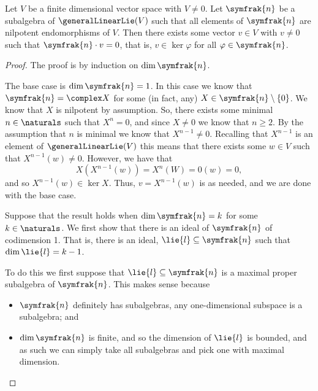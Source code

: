 \documentclass[fleqn]{NotesClass}
\newcommand{\nilpotentLie}{\symfrak{n}}
\begin{document}
    \begin{thm}{}{}
        Let \(V\) be a finite dimensional vector space with \(V \ne 0\).
        Let \(\nilpotentLie\) be a subalgebra of \(\generalLinearLie(V)\) such that all elements of \(\nilpotentLie\) are nilpotent endomorphisms of \(V\).
        Then there exists some vector \(v \in V\) with \(v \ne 0\) such that \(\nilpotentLie \cdot v = 0\), that is, \(v \in \ker \varphi\) for all \(\varphi \in \nilpotentLie\).
        \begin{proof}
            The proof is by induction on \(\dim \nilpotentLie\).
            
            The base case is \(\dim \nilpotentLie = 1\).
            In this case we know that \(\nilpotentLie = \complex X\) for some (in fact, any) \(X \in \nilpotentLie \setminus \{0\}\).
            We know that \(X\) is nilpotent by assumption.
            So, there exists some minimal \(n \in \naturals\) such that \(X^n = 0\), and since \(X \ne 0\) we know that \(n \ge 2\).
            By the assumption that \(n\) is minimal we know that \(X^{n-1} \ne 0\).
            Recalling that \(X^{n-1}\) is an element of \(\generalLinearLie(V)\) this means that there exists some \(w \in V\) such that \(X^{n-1}(w) \ne 0\).
            However, we have that
            \begin{equation}
                X(X^{n-1}(w)) = X^n(W) = 0(w) = 0,
            \end{equation}
            and so \(X^{n-1}(w) \in \ker X\).
            Thus, \(v = X^{n-1}(w)\) is as needed, and we are done with the base case.
            
            Suppose that the result holds when \(\dim \nilpotentLie = k\) for some \(k \in \naturals\).
            We first show that there is an ideal of \(\nilpotentLie\) of codimension 1.
            That is, there is an ideal, \(\lie{l} \subseteq \nilpotentLie\) such that \(\dim \lie{l} = k - 1\).
            
            To do this we first suppose that \(\lie{l} \subseteq \nilpotentLie\) is a maximal proper subalgebra of \(\nilpotentLie\).
            This makes sense because
            \begin{itemize}
                \item \(\nilpotentLie\) definitely has subalgebras, any one-dimensional subspace is a subalgebra; and
                \item \(\dim \nilpotentLie\) is finite, and so the dimension of \(\lie{l}\) is bounded, and as such we can simply take all subalgebras and pick one with maximal dimension.
            \end{itemize}
            

\end{proof}
\end{thm}
\end{document}
